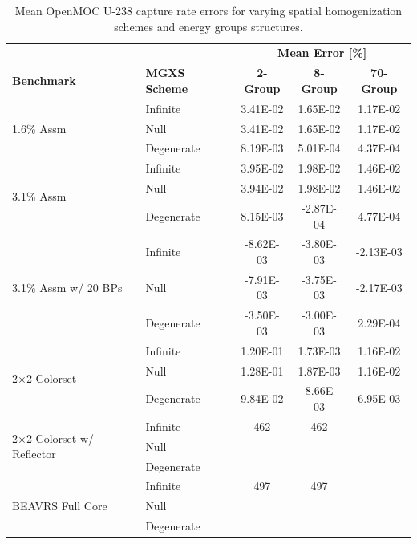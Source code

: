 \begin{table}[h!]
  \centering
  \caption[Mean OpenMOC U-238 capture rate errors]{Mean OpenMOC U-238 capture rate errors for varying spatial homogenization schemes and energy groups structures.}
  \small
  \label{table:chap8-openmoc-mean-capt-rates}
  \vspace{6pt}
  \begin{tabular}{l l c c c}
  \toprule
  \rowcolor{lightgray}
  & & \multicolumn{3}{c}{\cellcolor{lightgray} \textbf{Mean Error [\%]}} \\
  \multirow{-2}{*}{\cellcolor{lightgray} \bf Benchmark} &
  \multirow{-2}{*}{\cellcolor{lightgray} \bf \ac{MGXS} Scheme} &
  {\cellcolor{lightgray} \bf 2-Group} &
  {\cellcolor{lightgray} \bf 8-Group} &
  {\cellcolor{lightgray} \bf 70-Group} \\
  \midrule
\multirow{3}{*}{\parbox{2.5cm}{1.6\% Assm}} & Infinite & 3.41E-02 & 1.65E-02 & 1.17E-02 \\
& Null & 3.41E-02 & 1.65E-02 & 1.17E-02 \\
& Degenerate & 8.19E-03 & 5.01E-04 & 4.37E-04 \\
  \midrule
\multirow{3}{*}{\parbox{2.5cm}{3.1\% Assm}} & Infinite & 3.95E-02 & 1.98E-02 & 1.46E-02 \\
& Null & 3.94E-02 & 1.98E-02 & 1.46E-02 \\
& Degenerate & 8.15E-03 & -2.87E-04 & 4.77E-04 \\
  \midrule
\multirow{3}{*}{\parbox{2.5cm}{3.1\% Assm w/ 20 BPs}} & Infinite & -8.62E-03 & -3.80E-03 & -2.13E-03 \\
& Null & -7.91E-03 & -3.75E-03 & -2.17E-03 \\
& Degenerate & -3.50E-03 & -3.00E-03 & 2.29E-04 \\
  \midrule
  \multirow{3}{*}{\parbox{2.5cm}{2$\times$2 Colorset}} & Infinite & 1.20E-01 & 1.73E-03 & 1.16E-02 \\
& Null & 1.28E-01 & 1.87E-03 & 1.16E-02 \\
& Degenerate & 9.84E-02 & -8.66E-03 & 6.95E-03 \\
  \midrule
  \multirow{3}{*}{\parbox{2.3cm}{2$\times$2 Colorset w/ Reflector}} & Infinite & 462 & 462 & \\
  & Null & & & \\
  & Degenerate & & & \\
  \midrule
  \multirow{3}{*}{\parbox{2cm}{\ac{BEAVRS} Full Core}} & Infinite & 497 & 497 & \\
  & Null & & & \\
  & Degenerate & & & \\
  \bottomrule
\end{tabular}
\end{table}


